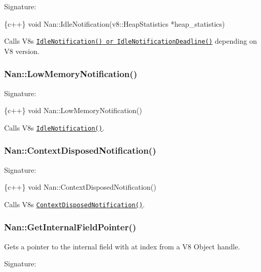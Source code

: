 Signature\+:


\begin{DoxyCode}
\{c++\}
void Nan::IdleNotification(v8::HeapStatistics *heap\_statistics)
\end{DoxyCode}


Calls V8\textquotesingle{}s \href{https://v8docs.nodesource.com/io.js-3.0/d5/dda/classv8_1_1_isolate.html#ad6a2a02657f5425ad460060652a5a118}{\tt {\ttfamily Idle\+Notification()} or {\ttfamily Idle\+Notification\+Deadline()}} depending on V8 version.

\label{_api_nan_low_memory_notification}%
 \subsubsection*{Nan\+::\+Low\+Memory\+Notification()}

Signature\+:


\begin{DoxyCode}
\{c++\}
void Nan::LowMemoryNotification() 
\end{DoxyCode}


Calls V8\textquotesingle{}s \href{https://v8docs.nodesource.com/io.js-3.0/d5/dda/classv8_1_1_isolate.html#a24647f61d6b41f69668094bdcd6ea91f}{\tt {\ttfamily Idle\+Notification()}}.

\label{_api_nan_context_disposed_notification}%
 \subsubsection*{Nan\+::\+Context\+Disposed\+Notification()}

Signature\+:


\begin{DoxyCode}
\{c++\}
void Nan::ContextDisposedNotification()
\end{DoxyCode}


Calls V8\textquotesingle{}s \href{https://v8docs.nodesource.com/io.js-3.0/d5/dda/classv8_1_1_isolate.html#ad7f5dc559866343fe6cd8db1f134d48b}{\tt {\ttfamily Context\+Disposed\+Notification()}}.

\label{_api_nan_get_internal_field_pointer}%
 \subsubsection*{Nan\+::\+Get\+Internal\+Field\+Pointer()}

Gets a pointer to the internal field with at {\ttfamily index} from a V8 {\ttfamily Object} handle.

Signature\+:



